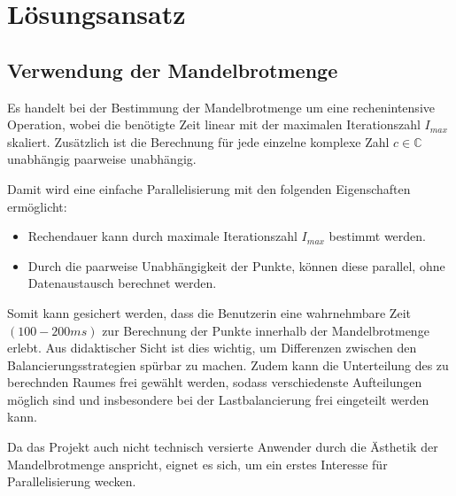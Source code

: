 \section{Lösungsansatz}

\subsection{Verwendung der Mandelbrotmenge}

Es handelt bei der Bestimmung der Mandelbrotmenge um eine rechenintensive Operation, wobei
die benötigte Zeit linear mit der maximalen Iterationszahl \( I_{max} \) skaliert.
Zusätzlich ist die Berechnung für jede einzelne komplexe Zahl \( c\in \mathbb{C} \)	unabhängig paarweise unabhängig.

Damit wird eine einfache Parallelisierung mit den folgenden Eigenschaften ermöglicht:
\begin{itemize}
	\item Rechendauer kann durch maximale Iterationszahl \( I_{max} \) bestimmt werden.
	\item Durch die paarweise Unabhängigkeit der Punkte, können diese parallel, ohne Datenaustausch berechnet werden.
\end{itemize}

Somit kann gesichert werden, dass die Benutzerin eine wahrnehmbare Zeit \( (100 - 200 ms) \) zur Berechnung der Punkte innerhalb
der Mandelbrotmenge erlebt.
Aus didaktischer Sicht ist dies wichtig, um Differenzen zwischen den Balancierungsstrategien spürbar zu machen.
Zudem kann die Unterteilung des zu berechnden Raumes frei gewählt werden, sodass
verschiedenste Aufteilungen möglich sind und insbesondere bei der Lastbalancierung frei eingeteilt werden kann.

Da das Projekt auch nicht technisch versierte Anwender durch die Ästhetik der Mandelbrotmenge anspricht, eignet es
sich, um ein erstes Interesse für Parallelisierung wecken.


